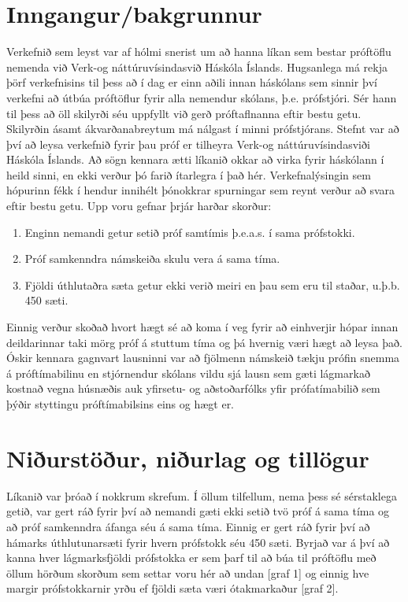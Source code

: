 \documentclass[12pt]{article}
\begin{document}
\section{Inngangur/bakgrunnur}
Verkefnið sem leyst var af hólmi snerist um að hanna líkan sem bestar próftöflu nemenda við Verk-og náttúruvísindasvið Háskóla Íslands. Hugsanlega má rekja þörf verkefnisins til þess að í dag er einn aðili innan háskólans sem sinnir því verkefni að útbúa próftöflur fyrir alla nemendur skólans, þ.e. prófstjóri. Sér hann til þess að öll skilyrði séu uppfyllt við gerð próftaflnanna eftir bestu getu. Skilyrðin ásamt ákvarðanabreytum má nálgast í minni prófstjórans.
Stefnt var að því að leysa verkefnið fyrir þau próf er tilheyra Verk-og náttúruvísindasviði Háskóla Íslands. Að sögn kennara ætti líkanið okkar að virka fyrir háskólann í heild sinni, en ekki verður þó farið ítarlegra í það hér.
Verkefnalýsingin sem hópurinn fékk í hendur innihélt þónokkrar spurningar sem reynt verður að svara eftir bestu getu. 
Upp voru gefnar þrjár harðar skorður:

\begin{enumerate}
\item Enginn nemandi getur setið próf samtímis þ.e.a.s. í sama prófstokki.
\item Próf samkenndra námskeiða skulu vera á sama tíma.
\item Fjöldi úthlutaðra sæta getur ekki verið meiri en þau sem eru til staðar, u.þ.b. 450 sæti.
\end{enumerate}

Einnig verður skoðað hvort hægt sé að koma í veg fyrir að einhverjir hópar innan deildarinnar taki mörg próf á stuttum tíma og þá hvernig væri hægt að leysa það. Óskir kennara gagnvart lausninni var að fjölmenn námskeið tækju prófin snemma á próftímabilinu en stjórnendur skólans vildu sjá lausn sem gæti lágmarkað kostnað vegna húsnæðis auk yfirsetu- og aðstoðarfólks yfir prófatímabilið sem þýðir styttingu próftímabilsins eins og hægt er.

\section{Niðurstöður, niðurlag og tillögur}
Líkanið var þróað í nokkrum skrefum. Í öllum tilfellum, nema þess sé sérstaklega getið, var gert ráð fyrir því að nemandi gæti ekki setið tvö próf á sama tíma og að próf samkenndra áfanga séu á sama tíma. Einnig er gert ráð fyrir því að hámarks úthlutunarsæti fyrir hvern prófstokk séu 450 sæti.
Byrjað var á því að kanna hver lágmarksfjöldi prófstokka er sem þarf til að búa til próftöflu með öllum hörðum skorðum sem settar voru hér að undan [graf 1] og einnig hve margir prófstokkarnir yrðu ef fjöldi sæta væri ótakmarkaður [graf 2]. 
\end{document}
